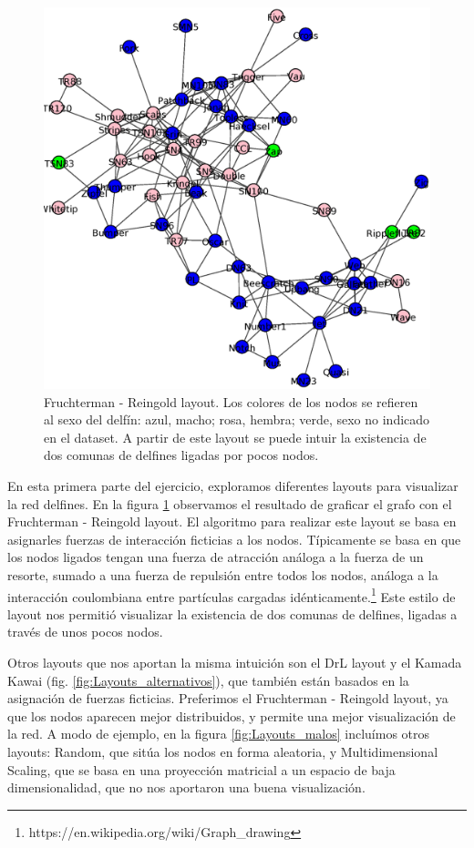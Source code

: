 \begin{figure}
\centering
\includegraphics[scale = 0.50]{figuras/FrutRein.eps}
\caption{Fruchterman - Reingold layout. Los colores de los nodos se refieren al sexo del delfín: azul, macho; rosa, hembra; verde, sexo no indicado en el dataset. A partir de este layout se puede intuir la existencia de dos comunas de delfines ligadas por pocos nodos.}
\label{fig:Layout_delfines}
\end{figure}

\par En esta primera parte del ejercicio, exploramos diferentes layouts para visualizar la red delfines.
En la figura \ref{fig:Layout_delfines} observamos el resultado de graficar
el grafo con el Fruchterman - Reingold layout. El algoritmo para realizar este layout se basa en asignarles fuerzas de interacción ficticias a los nodos. Típicamente se basa en que los nodos ligados tengan una fuerza de atracción análoga a la fuerza de un resorte, sumado a una fuerza de repulsión entre todos los nodos, análoga a la interacción coulombiana entre partículas cargadas idénticamente.\footnote{https://en.wikipedia.org/wiki/Graph\_drawing}
Este estilo de layout nos permitió visualizar la existencia de dos comunas de delfines, ligadas a través de unos pocos nodos.
\par Otros layouts que nos aportan la misma intuición son el DrL layout y el Kamada Kawai (fig. \ref{fig:Layouts_alternativos}), que también están basados en la asignación de fuerzas ficticias. Preferimos el Fruchterman - Reingold layout, ya que los nodos aparecen mejor distribuidos, y permite una mejor visualización de la red.
A modo de ejemplo, en la figura \ref{fig:Layouts_malos} incluímos otros layouts: Random, que sitúa los nodos en forma aleatoria, y Multidimensional Scaling, que se basa en una proyección matricial a un espacio de baja dimensionalidad, que no nos aportaron una buena visualización.

